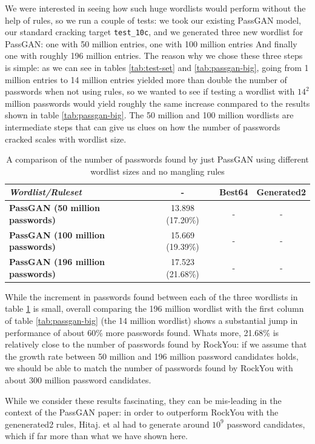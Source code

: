 We were interested in seeing how such huge wordlists would perform without the help of rules, so we run a couple of tests: we took our existing PassGAN model, our standard cracking target \texttt{test\_10c}, and we generated three new wordlist for PassGAN: one with 50 million entries, one with 100 million entries And finally one with roughly 196 million entries. 
The reason why we chose these three steps is simple: as we can see in tables \ref{tab:test-set} and \ref{tab:passgan-big}, going from 1 million entries to 14 million entries yielded more than double the number of passwords when not using rules, so we wanted to see if testing a wordlist with $14^2$ million passwords would yield roughly the same increase conmpared to the results shown in table \ref{tab:passgan-big}. The 50 million and 100 million wordlists are intermediate steps that can give us clues on how the number of passwords cracked scales with wordlist size.

\begin{table}[H]
\centering    
\begin{tabular}{|l|c|c|c|}
\hline
\textbf{\emph{Wordlist/Ruleset}} & \textbf{-} & \textbf{Best64} & \textbf{Generated2} \\ \hline
\textbf{PassGAN (50 million passwords)}          & 13.898 (17.20\%) & - & - \\ \hline
\textbf{PassGAN (100 million passwords)}          & 15.669 (19.39\%) & - & - \\ \hline
\textbf{PassGAN (196 million passwords)}          & 17.523 (21.68\%) & - & - \\ \hline
\end{tabular}
\caption{A comparison of the number of passwords found by just PassGAN using different wordlist sizes and no mangling rules} 
\label{tab:passgan-huge}
\end{table}

While the increment in passwords found between each of the three wordlists in table \ref{tab:passgan-huge} is small, overall comparing the 196 million wordlist with the first column of table \ref{tab:passgan-big}  (the 14 million wordlist) shows a substantial jump in performance of about 60\% more passwords found.
Whats more, 21.68\% is relatively close to the number of passwords found by RockYou: if we assume that the growth rate between 50 million and 196 million password candidates holds, we should be able to match the number of passwords found by RockYou with about 300 million password candidates.

While we consider these results fascinating, they can be mis-leading in the context of the PassGAN paper: in order to outperform RockYou with the genenerated2 rules, Hitaj. et al had to generate around $10^{9}$ password candidates, which if far more than what we have shown here.


